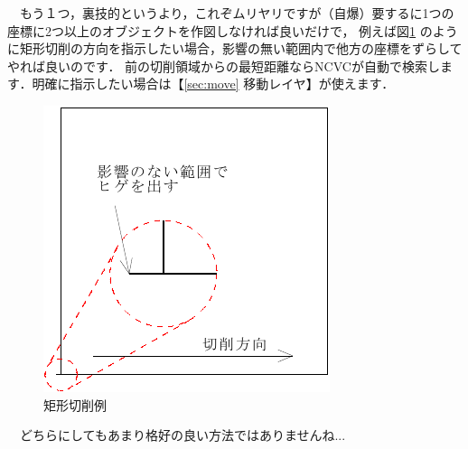 \vspace*{2zh}
\begin{minipage}[t]{0.6\textwidth}
　もう１つ，裏技的というより，これぞムリヤリですが（自爆）要するに1つの座標に2つ以上のオブジェクトを作図しなければ良いだけで，
例えば図\ref{fig:direction2} のように矩形切削の方向を指示したい場合，影響の無い範囲内で他方の座標をずらしてやれば良いのです．
前の切削領域からの最短距離ならNCVCが自動で検索します．明確に指示したい場合は【\ref{sec:move} 移動レイヤ】が使えます．
\end{minipage}
\begin{minipage}[t]{0.4\textwidth}
\vspace*{-2zh}
\begin{figure}[H]
\centering
\includegraphics[width=\textwidth]{No4/fig/direction2-crop.pdf}
\caption{矩形切削例}
\label{fig:direction2}
\end{figure}
\end{minipage}

\vspace*{2zh}
　どちらにしてもあまり格好の良い方法ではありませんね...